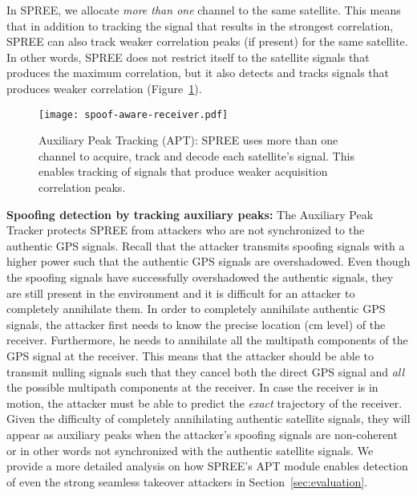 \documentclass[letterpaper,twocolumn,10pt]{article}
\newcommand{\rxname}{SPREE\xspace}
\begin{document}
In SPREE, we allocate \textit{more than one} channel to the same satellite. This means that in addition to tracking the signal that results in the strongest correlation, \rxname can also track weaker correlation peaks (if pres\-ent) for the same satellite. In other words, \rxname does not restrict itself to the satellite signals that produces the maximum correlation, but it also detects and tracks signals that produces weaker correlation (Figure~\ref{fig:spoof-aware-receiver-design}).\\

\begin{figure}[t]
  \centering
  \texttt{[image: spoof-aware-receiver.pdf]}
  \caption{Auxiliary Peak Tracking (APT): \rxname uses more than one channel to acquire, track and decode each satellite's signal. This enables tracking of signals that produce weaker acquisition correlation peaks.}
  \label{fig:spoof-aware-receiver-design}
\end{figure}






\noindent\textbf{Spoofing detection by tracking auxiliary peaks:} The Auxiliary Peak Tracker protects \rxname from attackers who are not synchronized to the authentic GPS signals. Recall that the attacker transmits spoofing signals with a higher power such that the authentic GPS signals are overshadowed. Even though the spoofing signals have successfully overshadowed the authentic signals, they are still present in the environment and it is difficult for an attacker to completely annihilate them. In order to completely annihilate authentic GPS signals, the attacker first needs to know the precise location (cm level) of the receiver. Furthermore, he needs to annihilate all the multipath components of the GPS signal at the receiver. This means that the attacker should be able to transmit nulling signals such that they cancel both the direct GPS signal and \textit{all} the possible multipath components at the receiver. In case the receiver is in motion, the attacker must be able to predict the \textit{exact} trajectory of the receiver. Given the difficulty of completely annihilating authentic satellite signals, they will appear as auxiliary peaks when the attacker's spoofing signals are non-coherent or in other words not synchronized with the authentic satellite signals. We provide a more detailed analysis on how \rxname's APT module enables detection of even the strong seamless takeover attackers in Section~\ref{sec:evaluation}.
\end{document}
